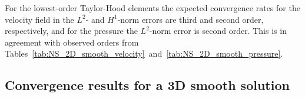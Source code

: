 For the lowest-order Taylor-Hood elements the expected convergence rates for the velocity field in the $L^2$- and $H^1$-norm errors are third and second order, respectively, and for the pressure the $L^2$-norm error is second order. This is in agreement with observed orders from Tables~\ref{tab:NS_2D_smooth_velocity}~and~\ref{tab:NS_2D_smooth_pressure}.

\subsection{Convergence results for a 3D smooth solution}


